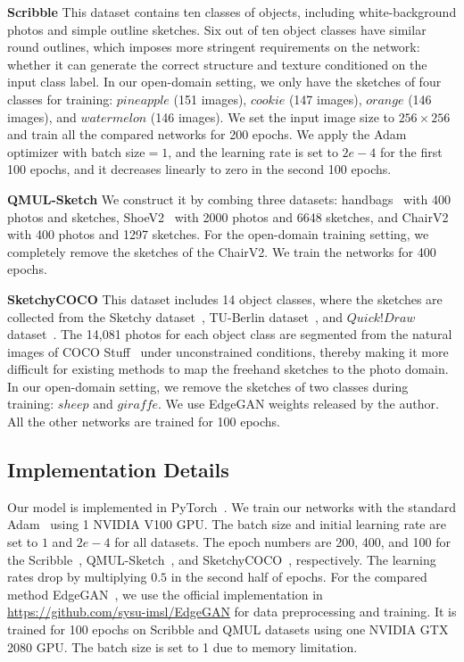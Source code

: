 \documentclass[10pt,twocolumn,letterpaper]{article}
\begin{document}
\noindent \textbf{Scribble} This dataset contains ten classes of objects, including white-background photos and simple outline sketches. Six out of ten object classes have similar round outlines, which imposes more stringent requirements on the network: whether it can generate the correct structure and texture conditioned on the input class label. In our open-domain setting, we only have the sketches of four classes for training: $pineapple$ (151 images), $cookie$ (147 images), $orange$ (146 images), and $watermelon$ (146 images). We set the input image size to $256\times 256$ and train all the compared networks for 200 epochs. We apply the Adam~\cite{kingma2014adam} optimizer with batch size$=1$, and the learning rate is set to $2e-4$ for the first 100 epochs, and it decreases linearly to zero in the second 100 epochs. 

\noindent \textbf{QMUL-Sketch} We construct it by combing three datasets: handbags~\cite{song2017deep} with 400 photos and sketches, ShoeV2~\cite{yu2016sketch} with 2000 photos and 6648 sketches, and ChairV2~\cite{liu2019unpaired} with 400 photos and 1297 sketches. For the open-domain training setting, we completely remove the sketches of the ChairV2. We train the networks for 400 epochs.

\noindent \textbf{SketchyCOCO} This dataset includes 14 object classes, where the sketches are collected from the Sketchy dataset~\cite{sangkloy2016sketchy}, TU-Berlin dataset~\cite{eitz2012humans}, and $Quick! Draw$
dataset~\cite{ha2017neural}. The 14,081 photos for each object class are segmented from the natural images of COCO Stuff~\cite{caesar2018coco} under unconstrained conditions, thereby making it more difficult for existing methods to map the freehand sketches to the photo domain. In our open-domain setting, we remove the sketches of two classes during training: $sheep$ and $giraffe$. We use EdgeGAN weights released by the author. All the other networks are trained for 100 epochs.

\subsection{Implementation Details} 
\label{sec:imple}
Our model is implemented in PyTorch~\cite{paszke2017automatic,paszke2019pytorch}. We train our networks with the standard Adam~\cite{kingma2014adam} using 1 NVIDIA V100 GPU. The batch size and initial learning rate are set to $1$ and $2e-4$ for all datasets. The epoch numbers are 200, 400, and 100 for the Scribble~\cite{ghosh2019interactive}, QMUL-Sketch~\cite{yu2016sketch,song2017deep,liu2019unpaired}, and SketchyCOCO~\cite{gao2020sketchycoco}, respectively. The learning rates drop by multiplying $0.5$ in the second half of epochs. 
For the compared method EdgeGAN~\cite{gao2020sketchycoco}, we use the official implementation in \href{https://github.com/sysu-imsl/EdgeGAN}{https://github.com/sysu-imsl/EdgeGAN} for data preprocessing and training. It is trained for 100 epochs on Scribble and QMUL datasets using one NVIDIA GTX 2080 GPU. The batch size is set to 1 due to memory limitation. 
\end{document}
